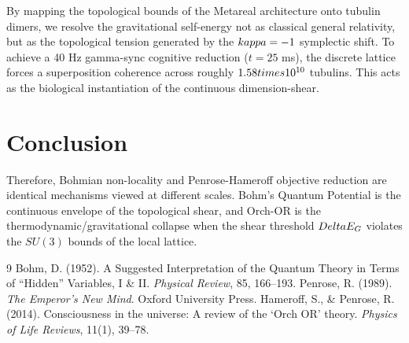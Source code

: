 By mapping the topological bounds of the Metareal architecture onto tubulin dimers, we resolve the gravitational self-energy not as classical general relativity, but as the topological tension generated by the $\\kappa = -1$ symplectic shift. To achieve a 40 Hz gamma-sync cognitive reduction ($t = 25$ ms), the discrete lattice forces a superposition coherence across roughly $1.58 \\times 10^{10}$ tubulins. This acts as the biological instantiation of the continuous dimension-shear.

\section{Conclusion}
Therefore, Bohmian non-locality and Penrose-Hameroff objective reduction are identical mechanisms viewed at different scales. Bohm's Quantum Potential is the continuous envelope of the topological shear, and Orch-OR is the thermodynamic/gravitational collapse when the shear threshold $\\Delta E_G$ violates the $SU(3)$ bounds of the local lattice.

\begin{thebibliography}{9}
 Bohm, D. (1952). A Suggested Interpretation of the Quantum Theory in Terms of ``Hidden'' Variables, I \& II. \emph{Physical Review}, 85, 166--193.
 Penrose, R. (1989). \emph{The Emperor's New Mind}. Oxford University Press.
 Hameroff, S., \& Penrose, R. (2014). Consciousness in the universe: A review of the `Orch OR' theory. \emph{Physics of Life Reviews}, 11(1), 39--78.
\end{thebibliography}
